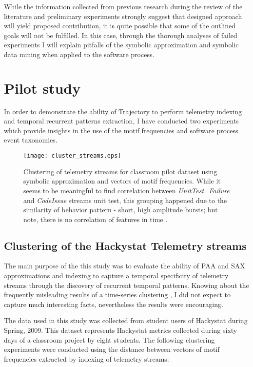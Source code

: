While the information collected from previous research during the review of the literature and preliminary experiments strongly suggest that designed approach will yield proposed contribution, it is quite possible that some of the outlined goals will not be fulfilled. In this case, through the thorough analyses of failed experiments I will explain pitfalls of the symbolic approximation and symbolic data mining when applied to the software process.

\section{Pilot study}\label{pilot.evaluation}
In order to demonstrate the ability of Trajectory to perform telemetry indexing and temporal recurrent patterns extraction, I have conducted two experiments which provide insights in the use of the motif frequencies and software process event taxonomies. 

\begin{figure}[tbp]
   \centering
   \texttt{[image: cluster\_streams.eps]}
   \caption{Clustering of telemetry streams for classroom pilot dataset using symbolic approximation and vectors of motif frequencies. While it seems to be meaningful to find correlation between \textit{UnitTest\_Failure} and \textit{CodeIssue} streams unit test, this grouping happened due to the similarity of behavior pattern - short, high amplitude bursts; but note, there is no correlation of features in time .}
   \label{fig:cluster_streams}
\end{figure}

\subsection{Clustering of the Hackystat Telemetry streams}
The main purpose of the this study was to evaluate the ability of PAA and SAX approximations and indexing to capture a temporal specificity of telemetry streams through the discovery of recurrent temporal patterns. Knowing about the frequently misleading results of a time-series clustering \cite{citeulike:227029}, I did not expect to capture much interesting facts, nevertheless the results were encouraging.

The data used in this study was collected from student users of Hackystat during Spring, 2009. This dataset represents Hackystat metrics collected during sixty days of a classroom project by eight students. The following clustering experiments were conducted using the distance between vectors of motif frequencies extracted by indexing of telemetry streams:

